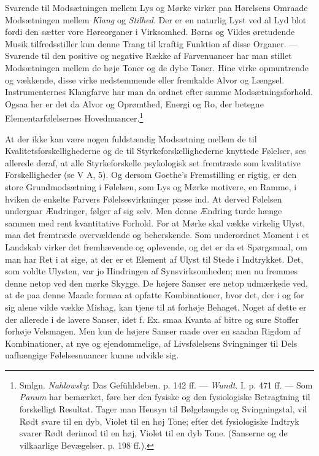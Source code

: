\documentclass[12pt,a4paper,openany]{book}
\newcommand{\opage}[1]{\marginnote{\footnotesize\textit{[#1]}}}
\begin{document}
Svarende til Modsætningen mellem Lys og Mørke virker paa Hørelsens
Omraade Modsætningen mellem \emph{Klang} og \emph{Stilhed}. Der er en
naturlig Lyst ved al Lyd blot fordi den sætter vore Høreorganer i
Virksomhed. Børns og Vildes øretudende Musik tilfredsstiller kun denne
Trang til kraftig Funktion af disse Organer. --- Svarende til den
positive og negative Række af Farvenuancer har man stillet Modsætningen
mellem de høje Toner og de dybe Toner. Hine virke opmuntrende og
vækkende, disse virke nedstemmende eller fremkalde Alvor og Længsel.
Instrumenternes Klangfarve har man da ordnet efter samme
Modsætningsforhold. Ogsaa her er det da Alvor og Oprømthed, Energi og
Ro, der betegne Elementarfølelsernes Hovednuancer.\footnote[1]{Smlgn.
\emph{Nahlowsky}: Das Gefühlsleben. p. 142 ff. --- \emph{Wundt}. I. p.
471 ff. --- Som \emph{Panum} har bemærket, føre her den fysiske og den
fysiologiske Betragtning til forskelligt Resultat. Tager man Hensyn til
Bølgelængde og Svingningstal, vil Rødt svare til en dyb, Violet til en
høj Tone; efter det fysiologiske Indtryk svarer Rødt derimod til en høj,
Violet til en dyb Tone. (Sanserne og de vilkaarlige Bevægelser. p. 198
ff.).}

At der ikke kan være nogen fuldstændig Modsætning mellem de til
Kvalitetsforskellighederne og de til Styrkeforskellighederne knyttede
Følelser, ses allerede deraf, at alle Styrkeforskelle psykologisk set
fremtræde som kvalitative Forskelligheder (se V A, 5). Og dersom
Goethe’s Fremstilling er rigtig, er den store Grundmodsætning i
Følelsen, som Lys og Mørke motivere, en Ramme, i hviken de enkelte
Farvers Følelsesvirkninger passe ind. At derved Følelsen undergaar
Ændringer, følger af sig selv. Men denne Ændring turde hænge sammen med
rent kvantitative Forhold. For at Mørke skal vække virkelig Ulyst, maa
det fremtræde overvældende og beherskende. Som underordnet Moment i et
Landskab virker det fremhævende og oplevende, og det er da et
Spørgsmaal, om man har Ret i at sige, at der er et Element af Ulyst til
Stede i Indtrykket. Det, som voldte Ulysten, var jo
\opage{280}Hindringen af Synsvirksomheden; men nu fremmes denne netop
ved den mørke Skygge. De højere Sanser ere netop udmærkede ved, at de
paa denne Maade formaa at opfatte Kombinationer, hvor det, der i og for
sig alene vilde vække Mishag, kan tjene til at forhøje Behaget. Noget af
dette er der allerede i de lavere Sanser, idet f. Ex. smaa Kvanta af
bitre og sure Stoffer forhøje Velsmagen. Men kun de højere Sanser raade
over en saadan Rigdom af Kombinationer, at nye og ejendommelige, af
Livsfølelsens Svingninger til Dels uafhængige Følelsesnuancer kunne
udvikle sig.
\end{document}
